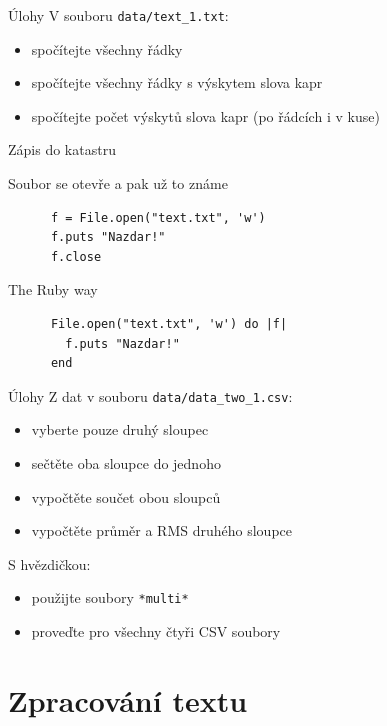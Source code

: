 \documentclass{beamer}
\begin{document}
\begin{frame}{Úlohy}
  V souboru \texttt{data/text\_1.txt}:
  \begin{itemize}
    \item spočítejte všechny řádky
    \item spočítejte všechny řádky s výskytem slova kapr
    \item spočítejte počet výskytů slova kapr (po řádcích i v kuse)
  \end{itemize}
\end{frame}

\begin{frame}[fragile]{Zápis do katastru}
  \begin{block}{Soubor se otevře a pak už to známe}
    \begin{verbatim}
      f = File.open("text.txt", 'w')
      f.puts "Nazdar!"
      f.close
    \end{verbatim}
  \end{block}
  \pause
  \begin{block}{The Ruby way}
    \begin{verbatim}
      File.open("text.txt", 'w') do |f|
        f.puts "Nazdar!"
      end
    \end{verbatim}
  \end{block}
\end{frame}

\begin{frame}{Úlohy}
  Z dat v souboru \texttt{data/data\_two\_1.csv}:
  \begin{itemize}
    \item vyberte pouze druhý sloupec
    \item sečtěte oba sloupce do jednoho
    \item vypočtěte součet obou sloupců
    \item vypočtěte průměr a RMS druhého sloupce
  \end{itemize}
  S hvězdičkou: 
  \begin{itemize}
    \item použijte soubory \texttt{*multi*}
    \item proveďte pro všechny čtyři CSV soubory 
  \end{itemize}
\end{frame}

\section{Zpracování textu}
\end{document}
